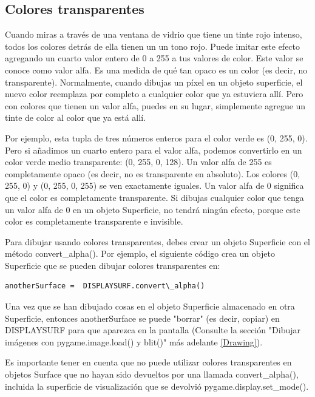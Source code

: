 \subsection{Colores transparentes}

Cuando miras a través de una ventana de vidrio que tiene un tinte rojo intenso, todos los colores detrás de ella tienen un
un tono rojo. Puede imitar este efecto agregando un cuarto valor entero de 0 a 255 a tus valores de color.
Este valor se conoce como valor {\ttfamily alfa}. Es una medida de qué tan opaco es un color (es decir, no transparente).
Normalmente, cuando dibujas un píxel en un objeto superficie, el nuevo color reemplaza por completo a cualquier color que ya estuviera allí. Pero con colores que tienen un valor alfa, puedes en su lugar, simplemente agregue un tinte de color al color que ya está allí.

Por ejemplo, esta tupla  de tres números enteros para el color verde es (0, 255, 0). Pero si añadimos un
cuarto entero para el valor {\ttfamily alfa}, podemos convertirlo en un color verde medio transparente: (0, 255,
0, 128). Un valor {\ttfamily alfa} de 255 es completamente opaco (es decir, no es transparente en absoluto). 
Los colores (0, 255, 0) y (0, 255, 0, 255) se ven exactamente iguales. Un valor {\ttfamily alfa} de 0
significa que el color es completamente transparente. Si dibujas cualquier color que tenga un valor {\ttfamily alfa} de 0 en
un objeto Superficie, no tendrá ningún efecto, porque este color es completamente transparente e invisible.

Para dibujar usando colores transparentes, debes crear un objeto Superficie con el
método {\ttfamily convert\_alpha()}. Por ejemplo, el siguiente código crea un objeto Superficie que
se pueden dibujar colores transparentes en:
\begin{lstlisting}
anotherSurface =  DISPLAYSURF.convert\_alpha()
\end{lstlisting}
Una vez que se han dibujado cosas en el objeto Superficie almacenado en otra Superficie, entonces
{\ttfamily anotherSurface} se puede "{}borrar"{} (es decir, copiar) en {\ttfamily DISPLAYSURF} para que aparezca en la
pantalla (Consulte la sección "{}Dibujar imágenes con pygame.image.load() y blit()"{} más adelante \ref{Drawing}).

Es importante tener en cuenta que no puede utilizar colores transparentes en objetos Surface que no hayan sido devueltos por
una llamada {\ttfamily convert\_alpha()}, incluida la superficie de visualización que se devolvió
{\ttfamily pygame.display.set\_mode()}.

